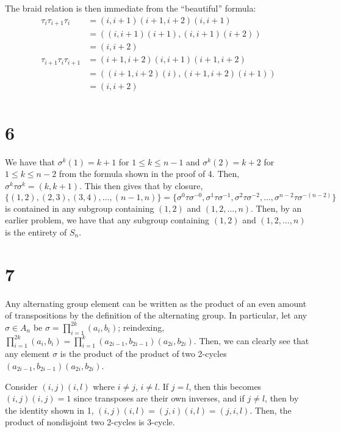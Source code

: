 \documentclass[12pt,letterpaper]{article}
\theoremstyle{definition}
\begin{document}
The braid relation is then immediate from the ``beautiful'' formula:
\begin{align*}
  \tau_{i}\tau_{i+1}\tau_{i} &= (i,i+1)(i+1,i+2)(i,i+1) \\
                             &= ((i,i+1)(i+1),(i,i+1)(i+2)) \\
                             &= (i, i+2) \\
  \tau_{i+1}\tau_{i}\tau_{i+1} &= (i+1,i+2)(i,i+1)(i+1,i+2) \\
                             &= ((i+1,i+2)(i),(i+1,i+2)(i+1)) \\
                             &= (i,i+2) \\
\end{align*}

\section*{6}

We have that $\sigma^{k}(1) = k + 1$ for $1 \leq k \leq n - 1$ and $\sigma^{k}(2) = k + 2$ for $1 \leq k \leq n - 2$ from the formula shown in the proof of 4. Then, $\sigma^{k}\tau\sigma^{k} = (k, k + 1)$. This then gives that by closure, $\{(1,2), (2,3), (3,4), \dots, (n-1,n)\} = \{\sigma^{0}\tau\sigma^{-0}, \sigma^{1}\tau\sigma^{-1}, \sigma^{2}\tau\sigma^{-2},\dots, \sigma^{n-2}\tau\sigma^{-(n-2)}\}$ is contained in any subgroup containing $(1,2)$ and $(1,2,\dots,n)$. Then, by an earlier problem, we have that any subgroup containing $(1,2)$ and $(1,2,\dots,n)$ is the entirety of $S_{n}$.

\section*{7}

Any alternating group element can be written as the product of an even amount of transpositions by the definition of the alternating group. In particular, let any $\sigma \in A_{n}$ be $\sigma = \prod_{i=1}^{2k}(a_{i},b_{i})$; reindexing, $\prod_{i=1}^{2k}(a_{i},b_{i}) = \prod_{i=1}^{k}(a_{2i-1},b_{2i-1})(a_{2i},b_{2i})$. Then, we can clearly see that any element $\sigma$ is the product of the product of two 2-cycles $(a_{2i - 1},b_{2i-1})(a_{2i},b_{2i})$.

Consider $(i,j)(i,l)$ where $i \neq j$, $i \neq l$. If $j = l$, then this becomes $(i,j)(i,j) = 1$ since transposes are their own inverses, and if $j \neq l$, then by the identity shown in 1, $(i,j)(i,l) = (j,i)(i,l) = (j,i,l)$. Then, the product of nondisjoint two 2-cycles is $3$-cycle.
\end{document}
